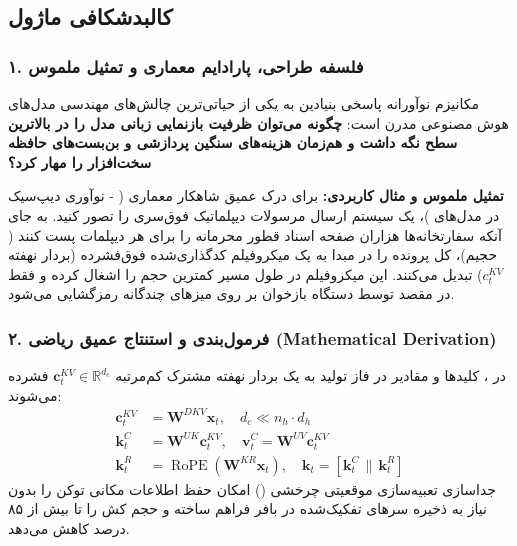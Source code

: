 \subsection{کالبدشکافی ماژول }

\subsubsection*{۱. فلسفه طراحی، پارادایم معماری و تمثیل ملموس}
مکانیزم نوآورانه  پاسخی بنیادین به یکی از حیاتی‌ترین چالش‌های مهندسی مدل‌های هوش مصنوعی مدرن است: \textbf{چگونه می‌توان ظرفیت بازنمایی زبانی مدل را در بالاترین سطح نگه داشت و هم‌زمان هزینه‌های سنگین پردازشی و بن‌بست‌های حافظه سخت‌افزار را مهار کرد؟}

\textbf{تمثیل ملموس و مثال کاربردی:}
برای درک عمیق شاهکار معماری  ( - نوآوری دیپ‌سیک در مدل‌های )، یک سیستم ارسال مرسولات دیپلماتیک فوق‌سری را تصور کنید. به جای آنکه سفارتخانه‌ها هزاران صفحه اسناد قطور محرمانه را برای هر دیپلمات پست کنند ( حجیم)، کل پرونده را در مبدا به یک میکروفیلم کدگذاری‌شده فوق‌فشرده (بردار نهفته $c_t^{KV}$) تبدیل می‌کنند. این میکروفیلم در طول مسیر کمترین حجم را اشغال کرده و فقط در مقصد توسط دستگاه بازخوان بر روی میزهای چندگانه رمزگشایی می‌شود.

\subsubsection*{۲. فرمول‌بندی و استنتاج عمیق ریاضی (Mathematical Derivation)}
در ، کلیدها و مقادیر در فاز تولید به یک بردار نهفته مشترک کم‌مرتبه $\mathbf{c}_t^{KV} \in \mathbb{R}^{d_c}$ فشرده می‌شوند:
\begin{align}
\mathbf{c}_t^{KV} &= \mathbf{W}^{DKV} \mathbf{x}_t, \quad d_c \ll n_h \cdot d_h \\
\mathbf{k}_t^C &= \mathbf{W}^{UK} \mathbf{c}_t^{KV}, \quad \mathbf{v}_t^C = \mathbf{W}^{UV} \mathbf{c}_t^{KV} \\
\mathbf{k}_t^R &= \operatorname{RoPE}(\mathbf{W}^{KR} \mathbf{x}_t), \quad \mathbf{k}_t = \left[ \mathbf{k}_t^C \,\|\, \mathbf{k}_t^R \right]
\end{align}
جداسازی تعبیه‌سازی موقعیتی چرخشی () امکان حفظ اطلاعات مکانی توکن را بدون نیاز به ذخیره سرهای تفکیک‌شده در بافر فراهم ساخته و حجم کش را تا بیش از ۸۵ درصد کاهش می‌دهد.

